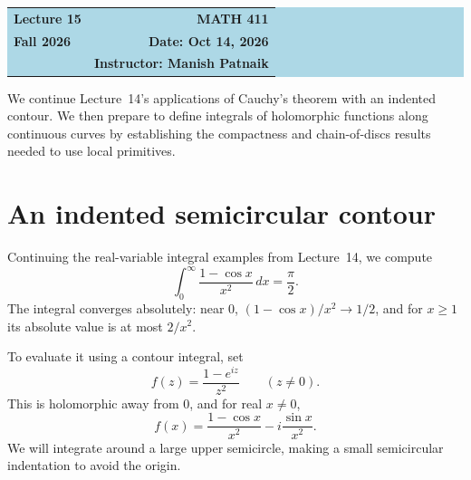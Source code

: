 \documentclass[11pt]{article}
\theoremstyle{plain}
\theoremstyle{definition}
\theoremstyle{remark}
\numberwithin{equation}{section}
\begin{document}
\begin{center}
  \colorbox{lightblue}{%
    \begin{minipage}{0.94\textwidth}
      \vspace{0.55em}
      \begin{tabular*}{\textwidth}{@{\extracolsep{\fill}}lr}
        {\color{courseblue}\bfseries\LARGE Lecture 15} &
        {\color{courseblue}\bfseries\LARGE MATH 411}\\[0.35em]
        \textbf{Fall 2026} & \textbf{Date: Oct 14, 2026}\\
        & \textbf{Instructor: Manish Patnaik}
      \end{tabular*}
      \vspace{0.45em}
    \end{minipage}}
\end{center}

\setcounter{tocdepth}{1}
\tableofcontents
\vspace{0.45em}

We continue Lecture~14's applications of Cauchy's theorem with an indented
contour. We then prepare to define integrals of holomorphic functions along
continuous curves by establishing the compactness and chain-of-discs results
needed to use local primitives.

\section{An indented semicircular contour}
Continuing the real-variable integral examples from Lecture~14, we compute
\begin{equation}\label{eq:cosine-goal}
 \boxed{\displaystyle\int_0^\infty\frac{1-\cos x}{x^2}\,dx=\frac\pi2.}
\end{equation}
The integral converges absolutely: near $0$, $(1-\cos x)/x^2\to1/2$, and for
$x\geq1$ its absolute value is at most $2/x^2$.

To evaluate it using a contour integral, set
\[
 f(z)=\frac{1-e^{iz}}{z^2}\qquad(z\neq0).
\]
This is holomorphic away from $0$, and for real $x\neq0$,
\[
 f(x)=\frac{1-\cos x}{x^2}-i\frac{\sin x}{x^2}.
\]
We will integrate around a large upper semicircle, making a small
semicircular indentation to avoid the origin.
\end{document}
